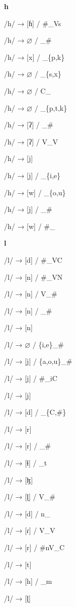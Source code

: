 \begin{center}\textbf{h}\end{center}
\begin{multicols}{4}
\noindent /h/ → [ɦ] / \#\_Vs

\noindent /h/ → $\varnothing$ / \_\#

\noindent /h/ → [x] / \_\{p,k\}

\noindent /h/ → $\varnothing$ / \_\{s,x\}

\noindent /h/ → $\varnothing$ / C\_

\noindent /h/ → $\varnothing$ / \_\{p,t,k\}

\noindent /h/ → [ʔ] / \_\#

\noindent /h/ → [ʔ] / V\_V

\noindent /h/ → [j]

\noindent /h/ → [j] / \_\{i,e\}

\noindent /h/ → [w] / \_\{o,u\}

\noindent /h/ → [j] / \_\#

\noindent /h/ → [w] / \#\_

\end{multicols}

\begin{center}\textbf{l}\end{center}
\begin{multicols}{4}
\noindent /l/ → [d] / \#\_VC

\noindent /l/ → [n] / \#\_VN

\noindent /l/ → [n] / V\_\#

\noindent /l/ → [n] / \_\#

\noindent /l/ → [n]

\noindent /l/ → $\varnothing$ / \{i,e\}\_\#

\noindent /l/ → [j] / \{a,o,u\}\_\#

\noindent /l/ → [j] / \#\_iC

\noindent /l/ → [j]

\noindent /l/ → [d] / \_\{C,\#\}

\noindent /l/ → [r]

\noindent /l/ → [r] / \_\#

\noindent /l/ → [ɬ] / \_t

\noindent /l/ → [ɮ]

\noindent /l/ → [ɭ] / V\_\#

\noindent /l/ → [d] / n\_

\noindent /l/ → [ɾ] / V\_V

\noindent /l/ → [r] / \#nV\_C

\noindent /l/ → [t]

\noindent /l/ → [h] / \_m

\noindent /l/ → [ɭ]
\end{multicols}


